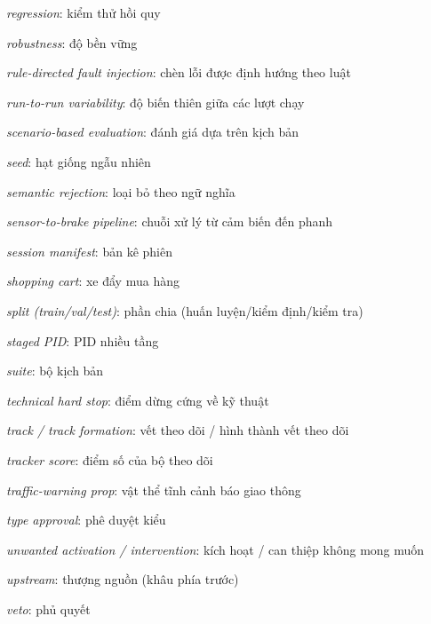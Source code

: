 \documentclass[conference]{IEEEtran}
\begin{document}
{\textit{regression}: kiểm thử hồi quy\par
\textit{robustness}: độ bền vững\par
\textit{rule-directed fault injection}: chèn lỗi được định hướng theo luật\par
\textit{run-to-run variability}: độ biến thiên giữa các lượt chạy\par
\textit{scenario-based evaluation}: đánh giá dựa trên kịch bản\par
\textit{seed}: hạt giống ngẫu nhiên\par
\textit{semantic rejection}: loại bỏ theo ngữ nghĩa\par
\textit{sensor-to-brake pipeline}: chuỗi xử lý từ cảm biến đến phanh\par
\textit{session manifest}: bản kê phiên\par
\textit{shopping cart}: xe đẩy mua hàng\par
\textit{split (train/val/test)}: phần chia (huấn luyện/kiểm định/kiểm tra)\par
\textit{staged PID}: PID nhiều tầng\par
\textit{suite}: bộ kịch bản\par
\textit{technical hard stop}: điểm dừng cứng về kỹ thuật\par
\textit{track / track formation}: vết theo dõi / hình thành vết theo dõi\par
\textit{tracker score}: điểm số của bộ theo dõi\par
\textit{traffic-warning prop}: vật thể tĩnh cảnh báo giao thông\par
\textit{type approval}: phê duyệt kiểu\par
\textit{unwanted activation / intervention}: kích hoạt / can thiệp không mong muốn\par
\textit{upstream}: thượng nguồn (khâu phía trước)\par
\textit{veto}: phủ quyết\par
}

\balance


\end{document}
